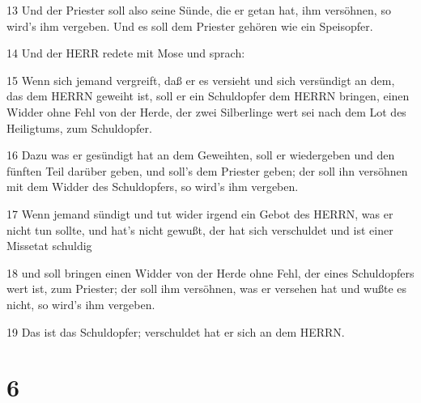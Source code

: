 \par 13 Und der Priester soll also seine Sünde, die er getan hat, ihm versöhnen, so wird's ihm vergeben. Und es soll dem Priester gehören wie ein Speisopfer.
\par 14 Und der HERR redete mit Mose und sprach:
\par 15 Wenn sich jemand vergreift, daß er es versieht und sich versündigt an dem, das dem HERRN geweiht ist, soll er ein Schuldopfer dem HERRN bringen, einen Widder ohne Fehl von der Herde, der zwei Silberlinge wert sei nach dem Lot des Heiligtums, zum Schuldopfer.
\par 16 Dazu was er gesündigt hat an dem Geweihten, soll er wiedergeben und den fünften Teil darüber geben, und soll's dem Priester geben; der soll ihn versöhnen mit dem Widder des Schuldopfers, so wird's ihm vergeben.
\par 17 Wenn jemand sündigt und tut wider irgend ein Gebot des HERRN, was er nicht tun sollte, und hat's nicht gewußt, der hat sich verschuldet und ist einer Missetat schuldig
\par 18 und soll bringen einen Widder von der Herde ohne Fehl, der eines Schuldopfers wert ist, zum Priester; der soll ihm versöhnen, was er versehen hat und wußte es nicht, so wird's ihm vergeben.
\par 19 Das ist das Schuldopfer; verschuldet hat er sich an dem HERRN.

\chapter{6}

